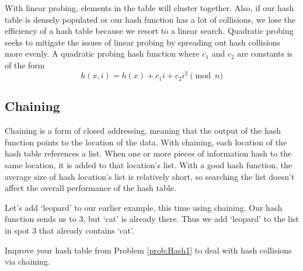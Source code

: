 With linear probing, elements in the table will cluster together.
Also, if our hash table is densely populated or our hash function has a lot of collisions, we lose the efficiency of a hash table because we resort to a linear search.
Quadratic probing seeks to mitigate the issues of linear probing by spreading out hash collisions more evenly.
A quadratic probing hash function where $c_1$ and $c_2$ are constants is of the form
\begin{equation*}
h(x, i) = h(x) + c_1i + c_2i^2 \pmod{n}
\end{equation*}

\subsection*{Chaining}
Chaining is a form of closed addressing, meaning that the output of the hash function points to the location of the data.
With chaining, each location of the hash table references a list.
When one or more pieces of information hash to the same location, it is added to that location's list.
With a good hash function, the average size of hash location's list is relatively short, so searching the list doesn't affect the overall performance of the hash table.

Let's add `leopard' to our earlier example, this time using chaining.
Our hash function sends us to 3, but `cat' is already there.
Thus we add `leopard' to the list in spot 3 that already contains `cat'.
\begin{center}
\end{center}

\begin{problem}
Improve your hash table from Problem \ref{prob:Hash1} to deal with hash collisions via chaining.
\end{problem}

